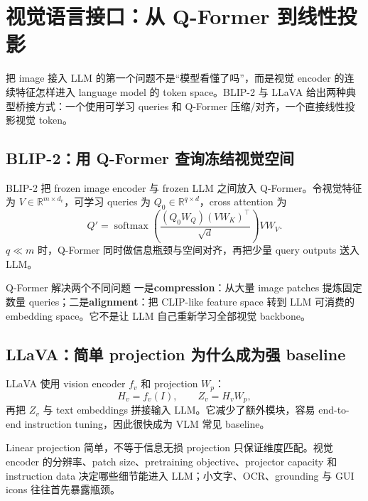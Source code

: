 \section{视觉语言接口：从 Q-Former 到线性投影}

把 image 接入 LLM 的第一个问题不是“模型看懂了吗”，而是视觉 encoder 的连续特征怎样进入 language model 的 token space。BLIP-2 与 LLaVA 给出两种典型桥接方式：一个使用可学习 queries 和 Q-Former 压缩/对齐，一个直接线性投影视觉 token。

\subsection{BLIP-2：用 Q-Former 查询冻结视觉空间}

BLIP-2 把 frozen image encoder 与 frozen LLM 之间放入 Q-Former。令视觉特征为 $V\in\mathbb{R}^{m\times d_v}$，可学习 queries 为 $Q_0\in\mathbb{R}^{q\times d}$，cross attention 为
\[
Q'=\operatorname{softmax}\!\left(\frac{(Q_0W_Q)(VW_K)^\top}{\sqrt d}\right)VW_V.
\]
$q\ll m$ 时，Q-Former 同时做信息瓶颈与空间对齐，再把少量 query outputs 送入 LLM。


\begin{knowledgebox}{Q-Former 解决两个不同问题}
一是\textbf{compression}：从大量 image patches 提炼固定数量 queries；二是\textbf{alignment}：把 CLIP-like feature space 转到 LLM 可消费的 embedding space。它不是让 LLM 自己重新学习全部视觉 backbone。
\end{knowledgebox}


\subsection{LLaVA：简单 projection 为什么成为强 baseline}

LLaVA 使用 vision encoder $f_v$ 和 projection $W_p$：
\[
H_v=f_v(I),\qquad Z_v=H_vW_p,
\]
再把 $Z_v$ 与 text embeddings 拼接输入 LLM。它减少了额外模块，容易 end-to-end instruction tuning，因此很快成为 VLM 常见 baseline。


\begin{warningbox}{Linear projection 简单，不等于信息无损}
projection 只保证维度匹配。视觉 encoder 的分辨率、patch size、pretraining objective、projector capacity 和 instruction data 决定哪些细节能进入 LLM；小文字、OCR、grounding 与 GUI icons 往往首先暴露瓶颈。
\end{warningbox}

